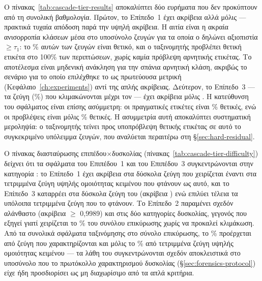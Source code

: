 Ο πίνακας~\ref{tab:cascade-tier-results} αποκαλύπτει δύο ευρήματα που δεν προκύπτουν από
τη συνολική βαθμολογία.
Πρώτον, το Επίπεδο~1 έχει ακρίβεια \TierOneAcc{} αλλά 
μόλις \TierOneFone --- πρακτικά τυχαία απόδοση παρά την υψηλή ακρίβεια.
Η αιτία είναι η
ακραία ανισορροπία κλάσεων μέσα στο υποσύνολο ζευγών για τα οποία ο
\texttt{} δηλώνει αξιοπιστία $\geq \tau_1$: το \TierOnePosPct\% αυτών
των ζευγών είναι θετικό, και ο ταξινομητής προβλέπει θετική ετικέτα στο 100\% των
περιπτώσεων, χωρίς καμία πρόβλεψη αρνητικής ετικέτας.
Το αποτέλεσμα είναι μηδενική
ανάκληση για την σπάνια αρνητική κλάση, ακριβώς το σενάριο για το οποίο επιλέχθηκε το
 ως πρωτεύουσα μετρική (Κεφάλαιο~\ref{ch:experiments}) αντί της απλής
ακρίβειας.
Δεύτερον, το Επίπεδο~3 --- τα \TierThreeCount{} ζεύγη (\TierThreePct\%) που κλιμακώνονται μέχρι τον
\texttt{} --- έχει ακρίβεια μόλις \TierThreeAcc.
Η κατεύθυνση του
σφάλματος είναι επίσης ασύμμετρη: οι πραγματικές ετικέτες είναι \TierThreeTruePosPct\% θετικές, ενώ οι
προβλέψεις είναι μόλις \TierThreePredPosPct\% θετικές.
Η ασυμμετρία αυτή αποκαλύπτει συστηματική
μεροληψία: ο ταξινομητής  τείνει προς υποπρόβλεψη θετικής ετικέτας σε αυτό
το συγκεκριμένο υπόλειμμα ζευγών, που αναλύεται περαιτέρω στη \S\ref{sec:hard-residual}.

Ο πίνακας διασταύρωσης επιπέδου$\times$δυσκολίας (πίνακας~\ref{tab:cascade-tier-difficulty})
δείχνει ότι τα σφάλματα του Επιπέδου~1 και του Επιπέδου~3 συγκεντρώνονται στην κατηγορία
: το Επίπεδο~1 έχει ακρίβεια \TierOneHardAcc{} στα \TierOneHardN{} δύσκολα ζεύγη που χειρίζεται
έναντι \TierOneHighTextsimAcc{} στα τετριμμένα ζεύγη υψηλής ομοιότητας κειμένου που φτάνουν ως αυτό, και το
Επίπεδο~3 καταρρέει στα \TierThreeHardN{} δύσκολα ζεύγη του (ακρίβεια \TierThreeHardAcc) ενώ επιλύει τέλεια τα
υπόλοιπα \TierThreeHighTextsimN{} τετριμμένα ζεύγη που το φτάνουν.
Το Επίπεδο~2 παραμένει σχεδόν αλάνθαστο
(ακρίβεια $\geq$ 0{,}9989) και στις δύο κατηγορίες δυσκολίας, γεγονός που εξηγεί γιατί
χειρίζεται το \TierTwoPct\% του συνόλου επικύρωσης χωρίς να προκαλεί κλιμάκωση.
Από τα \CascadeTotalErrors{}
συνολικά σφάλματα ταξινόμησης στο σύνολο επικύρωσης, το \CascadeErrorsHardPct\% προέρχεται από ζεύγη
που χαρακτηρίζονται  και μόλις το \CascadeErrorsTrivialPct\% από τετριμμένα ζεύγη υψηλής ομοιότητας
κειμένου --- τα λάθη του  συγκεντρώνονται σχεδόν αποκλειστικά στο υποσύνολο
που το πρωτόκολλο χαρακτηρισμού δυσκολίας (\S\ref{sec:forensics-protocol}) είχε ήδη
προσδιορίσει ως μη διαχωρίσιμο από τα απλά κριτήρια.

